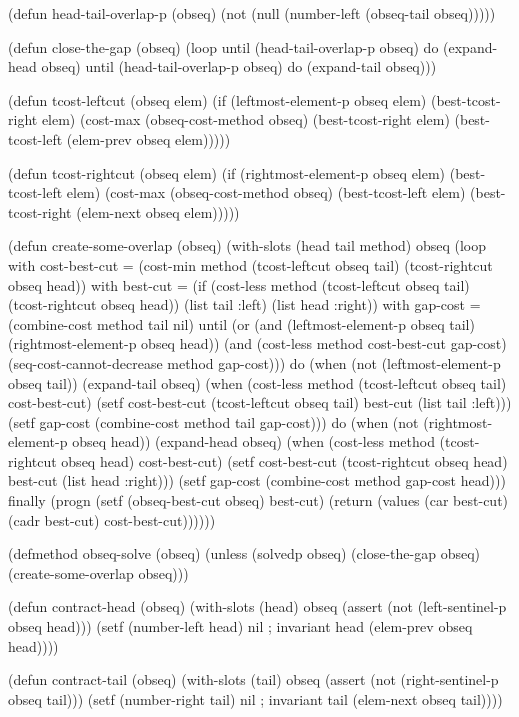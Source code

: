 (defun head-tail-overlap-p (obseq)
  (not (null (number-left (obseq-tail obseq)))))

(defun close-the-gap (obseq)
  (loop until (head-tail-overlap-p obseq)
	do (expand-head obseq)
	until (head-tail-overlap-p obseq)
	do (expand-tail obseq)))

(defun tcost-leftcut (obseq elem)
  (if (leftmost-element-p obseq elem)
      (best-tcost-right elem)
      (cost-max (obseq-cost-method obseq)
		(best-tcost-right elem)
		(best-tcost-left (elem-prev obseq elem)))))

(defun tcost-rightcut (obseq elem)
  (if (rightmost-element-p obseq elem)
      (best-tcost-left elem)
      (cost-max (obseq-cost-method obseq)
		(best-tcost-left elem)
		(best-tcost-right (elem-next obseq elem)))))

(defun create-some-overlap (obseq)
  (with-slots (head tail method) obseq
    (loop with cost-best-cut = (cost-min method
					 (tcost-leftcut obseq tail)
					 (tcost-rightcut obseq head))
	  with best-cut = (if (cost-less method
					 (tcost-leftcut obseq tail)
					 (tcost-rightcut obseq head))
			      (list tail :left)
			      (list head :right))
	  with gap-cost = (combine-cost method tail nil)
	  until (or (and (leftmost-element-p obseq tail)
			 (rightmost-element-p obseq head))
		    (and (cost-less method cost-best-cut gap-cost)
			 (seq-cost-cannot-decrease method gap-cost)))
	  do (when (not (leftmost-element-p obseq tail))
	       (expand-tail obseq)
	       (when (cost-less method (tcost-leftcut obseq tail) cost-best-cut)
		 (setf cost-best-cut (tcost-leftcut obseq tail)
		       best-cut (list tail :left)))
	       (setf gap-cost (combine-cost method tail gap-cost)))
	  do (when (not (rightmost-element-p obseq head))
	       (expand-head obseq)
	       (when (cost-less method (tcost-rightcut obseq head) cost-best-cut)
		 (setf cost-best-cut (tcost-rightcut obseq head)
		       best-cut (list head :right)))
	       (setf gap-cost (combine-cost method gap-cost head)))
	  finally (progn (setf (obseq-best-cut obseq) best-cut)
			 (return (values (car best-cut) (cadr best-cut) cost-best-cut))))))

(defmethod obseq-solve (obseq)
  (unless (solvedp obseq)
    (close-the-gap obseq)
    (create-some-overlap obseq)))

(defun contract-head (obseq)
  (with-slots (head) obseq
    (assert (not (left-sentinel-p obseq head)))
    (setf (number-left head) nil ; invariant
	  head (elem-prev obseq head))))

(defun contract-tail (obseq)
  (with-slots (tail) obseq
    (assert (not (right-sentinel-p obseq tail)))
    (setf (number-right tail) nil ; invariant
	  tail (elem-next obseq tail))))

